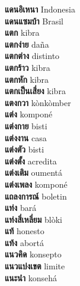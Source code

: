 \textbf{ แดนอิเหนา  } Indonesia \\
\textbf{ แดนแซมบ้า  } Brasil \\
\textbf{ แตก  } kibra \\
\textbf{ แตกง่าย  } daña \\
\textbf{ แตกต่าง  } distinto \\
\textbf{ แตกร้าว  } kibra \\
\textbf{ แตกหัก  } kibra \\
\textbf{ แตกเป็นเสี่ยง  } kibra \\
\textbf{ แตงกวา  } kònkòmber \\
\textbf{ แต่ง  } komponé \\
\textbf{ แต่งกาย  } bisti \\
\textbf{ แต่งงาน  } casa \\
\textbf{ แต่งตัว  } bisti \\
\textbf{ แต่งตั้ง  } acredita \\
\textbf{ แต่งเติม  } oumentá \\
\textbf{ แต่งเพลง  } komponé \\
\textbf{ แถลงการณ์  } boletin \\
\textbf{ แท่ง  } bará \\
\textbf{ แท่งสี่เหลี่ยม  } blòki \\
\textbf{ แท้  } honesto \\
\textbf{ แท้ง  } abortá \\
\textbf{ แนวคิด  } konsepto \\
\textbf{ แนวแบ่งเขต  } limite \\
\textbf{ แนะนำ  } konsehá \\
